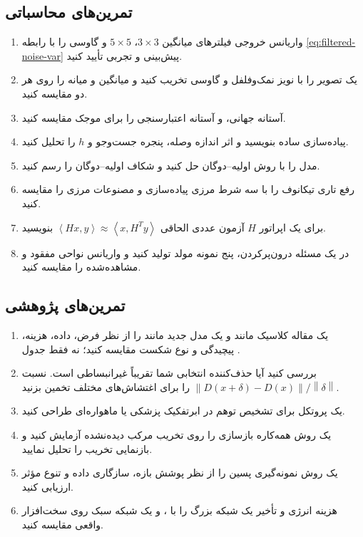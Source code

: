 \documentclass[12pt,openany,oneside]{book}
\newcommand{\norm}[1]{\left\lVert #1\right\rVert}
\newcommand{\inner}[2]{\left\langle #1,#2\right\rangle}
\begin{document}
\subsection*{تمرین‌های محاسباتی}
\begin{enumerate}
\item واریانس خروجی فیلترهای میانگین \(3\times3\)، \(5\times5\) و گاوسی را با رابطه \eqref{eq:filtered-noise-var} پیش‌بینی و تجربی تأیید کنید.
\item یک تصویر را با نویز نمک‌وفلفل و گاوسی تخریب کنید و میانگین و میانه را روی هر دو مقایسه کنید.
\item آستانه جهانی،  و آستانه اعتبارسنجی را برای موجک مقایسه کنید.
\item پیاده‌سازی ساده  بنویسید و اثر اندازه وصله، پنجره جست‌وجو و \(h\) را تحلیل کنید.
\item مدل  را با روش اولیه--دوگان حل کنید و شکاف اولیه--دوگان را رسم کنید.
\item رفع تاری تیکانوف را با سه شرط مرزی پیاده‌سازی و مصنوعات مرزی را مقایسه کنید.
\item برای یک اپراتور \(H\) آزمون عددی الحاقی
\(\inner{Hx}{y}\approx\inner{x}{H^Ty}\) بنویسید.
\item در یک مسئله درون‌پرکردن، پنج نمونه مولد تولید کنید و واریانس نواحی مفقود و مشاهده‌شده را مقایسه کنید.
\end{enumerate}

\subsection*{تمرین‌های پژوهشی}
\begin{enumerate}
\item یک مقاله کلاسیک مانند  و یک مدل جدید مانند  را از نظر فرض، داده، هزینه، پیچیدگی و نوع شکست مقایسه کنید؛ نه فقط جدول .
\item بررسی کنید آیا حذف‌کننده انتخابی شما تقریباً غیرانبساطی است. نسبت
\(\norm{D(x+\delta)-D(x)}/\norm{\delta}\) را برای اغتشاش‌های مختلف تخمین بزنید.
\item یک پروتکل برای تشخیص توهم در ابرتفکیک پزشکی یا ماهواره‌ای طراحی کنید.
\item یک روش همه‌کاره بازسازی را روی تخریب مرکب دیده‌نشده آزمایش کنید و بازنمایی تخریب را تحلیل نمایید.
\item یک روش نمونه‌گیری پسین را از نظر پوشش بازه، سازگاری داده و تنوع مؤثر ارزیابی کنید.
\item هزینه انرژی و تأخیر یک شبکه بزرگ را با ،  و یک شبکه سبک روی سخت‌افزار واقعی مقایسه کنید.
\end{enumerate}
\end{document}
